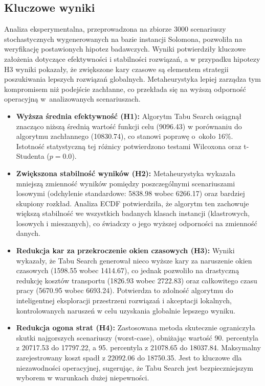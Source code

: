 \subsection{Kluczowe wyniki}
Analiza eksperymentalna, przeprowadzona na zbiorze 3000 scenariuszy stochastycznych wygenerowanych na bazie instancji Solomona, pozwoliła na weryfikację postawionych hipotez badawczych. Wyniki potwierdziły kluczowe założenia dotyczące efektywności i stabilności rozwiązań, a w przypadku hipotezy H3 wyniki pokazały, że zwiększone kary czasowe są elementem strategii poszukiwania lepszych rozwiązań globalnych. Metaheurystyka lepiej zarządza tym kompromisem niż podejście zachłanne, co przekłada się na wyższą odporność operacyjną w~analizowanych scenariuszach.

\begin{itemize}
    \item \textbf{Wyższa średnia efektywność (H1):} Algorytm Tabu Search osiągnął znacząco niższą średnią wartość funkcji celu (9096.43) w porównaniu do algorytmu zachłannego (10830.74), co stanowi poprawę o~około 16\%. Istotność statystyczną tej różnicy potwierdzono testami Wilcoxona oraz t-Studenta ($p = 0.0$).
    
    \item \textbf{Zwiększona stabilność wyników (H2):} Metaheurystyka wykazała mniejszą zmienność wyników pomiędzy poszczególnymi scenariuszami losowymi (odchylenie standardowe: 5838.98 wobec 6266.17) oraz bardziej skupiony rozkład. Analiza ECDF potwierdziła, że algorytm ten zachowuje większą stabilność we wszystkich badanych klasach instancji (klastrowych, losowych i mieszanych), co świadczy o jego wyższej odporności na zmienność danych.
    
    \item \textbf{Redukcja kar za przekroczenie okien czasowych (H3):} Wyniki wykazały, że Tabu Search generował nieco wyższe kary za naruszenie okien czasowych (1598.55 wobec 1414.67), co jednak pozwoliło na drastyczną redukcję kosztów transportu (1826.93 wobec 2722.83) oraz całkowitego czasu pracy (5670.95 wobec 6693.24). Potwierdza to zdolność algorytmu do inteligentnej eksploracji przestrzeni rozwiązań i akceptacji lokalnych, kontrolowanych naruszeń w celu uzyskania globalnie lepszego wyniku.
    
    \item \textbf{Redukcja ogona strat (H4):} Zastosowana metoda skutecznie ograniczyła skutki najgorszych scenariuszy (worst-case), obniżając wartość 90. percentyla z 20717.53 do 17797.22, a 95. percentyla z 21078.65 do 18037.84. Maksymalny zarejestrowany koszt spadł z 22092.06 do 18750.35. Jest to kluczowe dla niezawodności operacyjnej, sugerując, że Tabu Search jest bezpieczniejszym wyborem w warunkach dużej niepewności.
\end{itemize}



